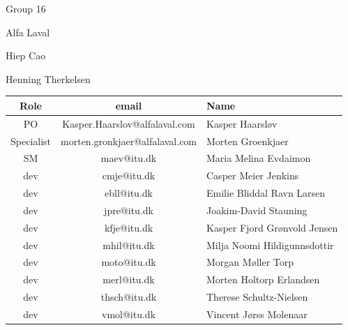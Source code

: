 \begin{description}[noitemsep,topsep=0pt,labelwidth=0pt,listparindent=-30pt,leftmargin=30pt,rightmargin=30pt]
\item[Team name: ] Group 16 
\item[Company: ] Alfa Laval  
\item[Teaching assistant: ] Hiep Cao
\item[Agile coach: ] Henning Therkelsen
\end{description}
\begin{table}[h]\begin{center}
\begin{tabular*}{1\textwidth}{@{}ccp{8cm}}
\toprule
Role & email & Name \\
\midrule
PO & Kasper.Haarslov@alfalaval.com & Kasper Haarsløv \\
Specialist & morten.gronkjaer@alfalaval.com & Morten Groenkjaer \\
SM & maev@itu.dk & Maria Melina Evdaimon \\
dev & cmje@itu.dk & Casper Meier Jenkins \\
dev & ebll@itu.dk & Emilie Bliddal Ravn Larsen \\
dev & jpre@itu.dk & Joakim-David Stauning \\
dev & kfje@itu.dk & Kasper Fjord Grønvold Jensen \\
dev & mhil@itu.dk & Milja Noomi Hildigunnsdottir \\
dev & moto@itu.dk & Morgan Møller Torp \\
dev & merl@itu.dk & Morten Holtorp Erlandsen \\
dev & thsch@itu.dk & Therese Schultz-Nielsen \\
dev & vmol@itu.dk & Vincent Jørss Molenaar\\
\bottomrule
\end{tabular*}\end{center}\end{table}

